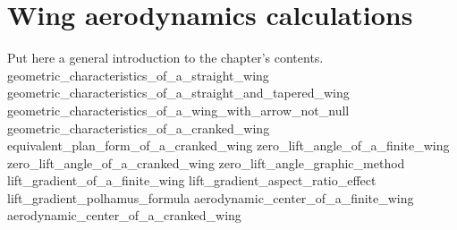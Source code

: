 \documentclass[[12pt,twoside]{book}
\begin{document}
%
%
\chapter%
   [Wing aerodynamics calculations]%
   {Wing aerodynamics calculations}
\label{chap:Wing}

\setcounter{minitocdepth}{2}%
\minitoc %

\vspace{\baselineskip}

\noindent
Put here a general introduction to the chapter's contents.
%
{geometric_characteristics_of_a_straight_wing}
{geometric_characteristics_of_a_straight_and_tapered_wing}
{geometric_characteristics_of_a_wing_with_arrow_not_null}
{geometric_characteristics_of_a_cranked_wing}
{equivalent_plan_form_of_a_cranked_wing}
{zero_lift_angle_of_a_finite_wing}
{zero_lift_angle_of_a_cranked_wing}
{zero_lift_angle_graphic_method}
{lift_gradient_of_a_finite_wing}
{lift_gradient_aspect_ratio_effect}
{lift_gradient_polhamus_formula}
{aerodynamic_center_of_a_finite_wing}
{aerodynamic_center_of_a_cranked_wing}
\end{document}
